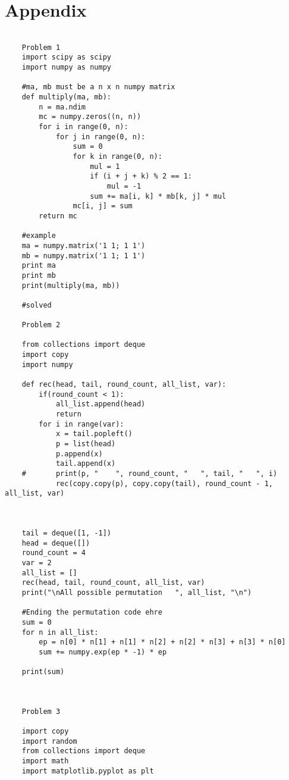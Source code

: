 \documentclass[a4paper]{article}
\begin{document}
    \section{Appendix}
    \begin{verbatim}
    
    Problem 1
    import scipy as scipy
    import numpy as numpy
    
    #ma, mb must be a n x n numpy matrix
    def multiply(ma, mb):
        n = ma.ndim
        mc = numpy.zeros((n, n))
        for i in range(0, n):
            for j in range(0, n):
                sum = 0
                for k in range(0, n):
                    mul = 1
                    if (i + j + k) % 2 == 1:
                        mul = -1
                    sum += ma[i, k] * mb[k, j] * mul
                mc[i, j] = sum
        return mc
    
    #example
    ma = numpy.matrix('1 1; 1 1')
    mb = numpy.matrix('1 1; 1 1')
    print ma
    print mb
    print(multiply(ma, mb))
    
    #solved
    
    Problem 2
    
    from collections import deque
    import copy
    import numpy
    
    def rec(head, tail, round_count, all_list, var):
        if(round_count < 1):
            all_list.append(head)
            return
        for i in range(var):
            x = tail.popleft()
            p = list(head)
            p.append(x)
            tail.append(x)
    #       print(p, "    ", round_count, "   ", tail, "   ", i)
            rec(copy.copy(p), copy.copy(tail), round_count - 1, all_list, var)
    
    
    
    tail = deque([1, -1])
    head = deque([])
    round_count = 4
    var = 2
    all_list = []
    rec(head, tail, round_count, all_list, var)
    print("\nAll possible permutation   ", all_list, "\n")
    
    #Ending the permutation code ehre
    sum = 0
    for n in all_list:
        ep = n[0] * n[1] + n[1] * n[2] + n[2] * n[3] + n[3] * n[0]
        sum += numpy.exp(ep * -1) * ep
    
    print(sum)
    
    
    
    Problem 3
    
    import copy
    import random
    from collections import deque
    import math
    import matplotlib.pyplot as plt
    

\end{verbatim}
\end{document}
